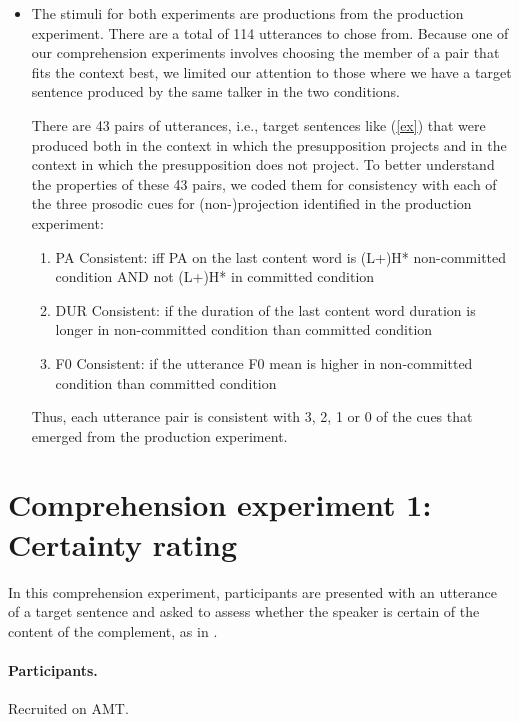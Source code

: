 \documentclass[dina4,12pt,fleqn]{article}
\newcommand{\6}{\mbox{$[\hspace*{-.6mm}[$}}
\newcommand{\9}{\mbox{$]\hspace*{-.6mm}]$}}
\begin{document}
\begin{itemize}[leftmargin=12pt]
\item The stimuli for both experiments are productions from the production experiment. There are a total of 114 utterances to chose from. Because one of our comprehension experiments involves choosing the member of a pair that fits the context best, we limited our attention to those where we have a target sentence produced by the same talker in the two conditions.

There are 43 pairs of utterances, i.e., target sentences like (\ref{ex}) that were produced both in the context in which the presupposition projects and in the context in which the presupposition does not project. To better understand the properties of these 43 pairs, we coded them for consistency with each of the three prosodic cues for (non-)projection identified in the production experiment:

\begin{enumerate}[noitemsep]
    \item PA Consistent: iff PA on the last content word is (L+)H* non-committed condition AND not (L+)H* in committed condition
    \item DUR Consistent: if the duration of the last content word duration is longer in non-committed condition than committed condition
    \item F0 Consistent: if the utterance F0 mean is higher in non-committed condition than committed condition
\end{enumerate}

Thus, each utterance pair is consistent with 3, 2, 1 or 0 of the cues that emerged from the production experiment. 

\end{itemize}



\section{Comprehension experiment 1: Certainty rating}

In this comprehension experiment, participants are presented with an utterance of a target sentence and asked to assess whether the speaker is certain of the content of the complement, as in \citealt{tonhauser-2016,stevens-etal-2017,tbd-variability}.

\paragraph{Participants.} Recruited on AMT.
\end{document}
